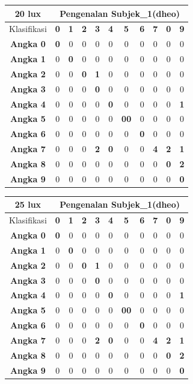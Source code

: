 \begin{tabular}{|c|c|c|c|c|c|c|c|c|c|c|}
	\hline 20 lux
	& \multicolumn{10}{|c|}{Pengenalan Subjek\_1(dheo)} \\
	\hline  Klasifikasi&\textbf{0} &\textbf{1} &\textbf{2} &\textbf{3} &\textbf{4}&\textbf{5} &\textbf{6}&\textbf{7}&\textbf{0}&\textbf{9}\\
	\hline \textbf{Angka 0} &\textbf{0} &0 &0 &0 &0 &0 &0 &0 &0 &0\\
	\hline \textbf{Angka 1} &0 &\textbf{0} &0 &0 &0 &0 &0 &0 &0 &0\\
	\hline \textbf{Angka 2} &0 &0 &\textbf{0} &\textbf{1} &0 &0 &0 &0 &0 &0\\
	\hline \textbf{Angka 3} &0 &0 &0 &\textbf{0} &0 &0 &0 &0 &0 &0\\
	\hline \textbf{Angka 4} &0 &0 &0 &0 &\textbf{0} &0 &0 &0 &0 &\textbf{1}\\
	\hline \textbf{Angka 5} &0 &0 &0 &0 &0 &\textbf{00} &0 &0 &0 &0\\
	\hline \textbf{Angka 6} &0 &0 &0 &0 &0 &0 &\textbf{0} &0 &0 &0\\
	\hline \textbf{Angka 7} &0 &0 &0 &\textbf{2} &\textbf{0} &0 &0 &\textbf{4} &\textbf{2} &\textbf{1}\\
	\hline \textbf{Angka 8} &0 &0 &0 &0 &0 &0 &0 &0 &\textbf{0} &\textbf{2} \\
	\hline \textbf{Angka 9} &0 &0 &0 &0 &0 &0 &0 &0 &0 &\textbf{0} \\
	\hline
\end{tabular}

\begin{tabular}{|c|c|c|c|c|c|c|c|c|c|c|}
	\hline 25 lux
	& \multicolumn{10}{|c|}{Pengenalan Subjek\_1(dheo)} \\
	\hline  Klasifikasi&\textbf{0} &\textbf{1} &\textbf{2} &\textbf{3} &\textbf{4}&\textbf{5} &\textbf{6}&\textbf{7}&\textbf{0}&\textbf{9}\\
	\hline \textbf{Angka 0} &\textbf{0} &0 &0 &0 &0 &0 &0 &0 &0 &0\\
	\hline \textbf{Angka 1} &0 &\textbf{0} &0 &0 &0 &0 &0 &0 &0 &0\\
	\hline \textbf{Angka 2} &0 &0 &\textbf{0} &\textbf{1} &0 &0 &0 &0 &0 &0\\
	\hline \textbf{Angka 3} &0 &0 &0 &\textbf{0} &0 &0 &0 &0 &0 &0\\
	\hline \textbf{Angka 4} &0 &0 &0 &0 &\textbf{0} &0 &0 &0 &0 &\textbf{1}\\
	\hline \textbf{Angka 5} &0 &0 &0 &0 &0 &\textbf{00} &0 &0 &0 &0\\
	\hline \textbf{Angka 6} &0 &0 &0 &0 &0 &0 &\textbf{0} &0 &0 &0\\
	\hline \textbf{Angka 7} &0 &0 &0 &\textbf{2} &\textbf{0} &0 &0 &\textbf{4} &\textbf{2} &\textbf{1}\\
	\hline \textbf{Angka 8} &0 &0 &0 &0 &0 &0 &0 &0 &\textbf{0} &\textbf{2} \\
	\hline \textbf{Angka 9} &0 &0 &0 &0 &0 &0 &0 &0 &0 &\textbf{0} \\
	\hline
\end{tabular}

